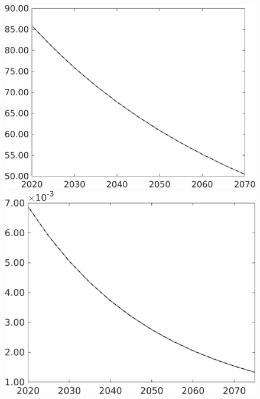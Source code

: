 \documentclass[12pt]{article}
\begin{document}
\begin{figure}[h!!]
\begin{minipage}[]{0.32\textwidth}
	\end{minipage}	
	\begin{minipage}[]{0.32\textwidth}
		\includegraphics[width=1\textwidth]{../../codding_model/own_basedOnFried/optimalPol_010922_revision/figures/all_13Sept22/CompTaul_Equlab_LFBAU_Reg0_gAf_spillover0_nsk0_xgr0_knspil1_sep1_countec0_GovRev0_etaa0.79_lgd0.png}
	\end{minipage}	
		\begin{minipage}[]{0.32\textwidth}
			\includegraphics[width=1\textwidth]{../../codding_model/own_basedOnFried/optimalPol_010922_revision/figures/all_13Sept22/CompTaul_Equlab_LFBAU_Reg0_AgAf_spillover0_nsk0_xgr0_knspil1_sep1_countec0_GovRev0_etaa0.79_lgd0.png}

\end{minipage}
\end{figure}
\end{document}
